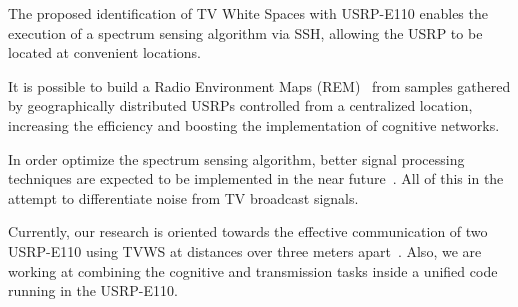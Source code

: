 The proposed identification of TV White Spaces with USRP-E110 enables the execution of a spectrum sensing algorithm via SSH, allowing the USRP to be located at convenient locations.

It is possible to build a Radio Environment Maps (REM)~\cite{zhao2007applying} from samples gathered by geographically distributed USRPs controlled from a centralized location, increasing the efficiency and boosting the implementation of cognitive networks.

In order optimize the spectrum sensing algorithm, better signal processing techniques are expected to be implemented in the near future~\cite{shellhammer2009technical}. All of this in the attempt to differentiate noise from TV broadcast signals.

Currently, our research is oriented towards the effective communication of two USRP-E110 using TVWS at distances over three meters apart~\cite{sanabriaUSRPTX}. Also, we are working at combining the cognitive and transmission tasks inside a unified code running in the USRP-E110.